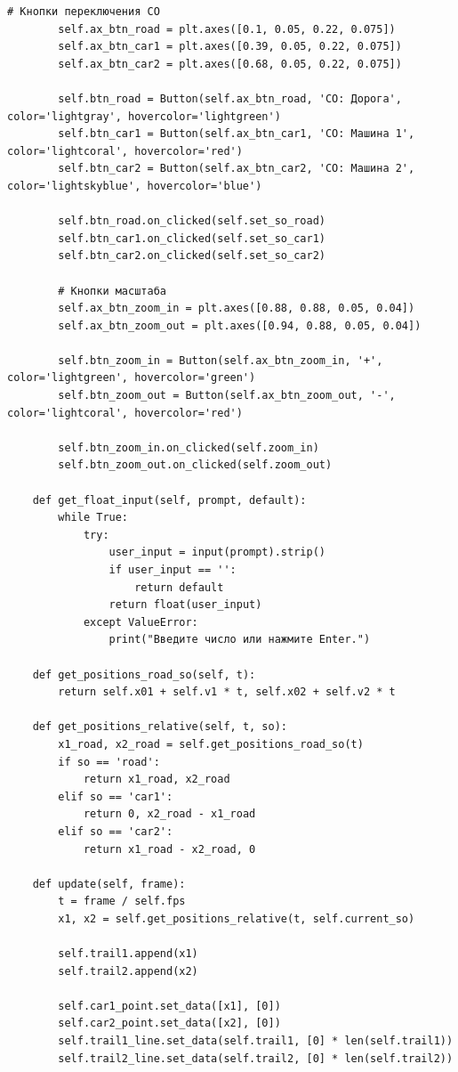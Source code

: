 \documentclass[12pt,a4paper]{article}
\begin{document}
\begin{lstlisting}[caption={Основной код симуляции (main.py)}, label={lst:main}]
        # Кнопки переключения СО
        self.ax_btn_road = plt.axes([0.1, 0.05, 0.22, 0.075])
        self.ax_btn_car1 = plt.axes([0.39, 0.05, 0.22, 0.075])
        self.ax_btn_car2 = plt.axes([0.68, 0.05, 0.22, 0.075])

        self.btn_road = Button(self.ax_btn_road, 'СО: Дорога', color='lightgray', hovercolor='lightgreen')
        self.btn_car1 = Button(self.ax_btn_car1, 'СО: Машина 1', color='lightcoral', hovercolor='red')
        self.btn_car2 = Button(self.ax_btn_car2, 'СО: Машина 2', color='lightskyblue', hovercolor='blue')

        self.btn_road.on_clicked(self.set_so_road)
        self.btn_car1.on_clicked(self.set_so_car1)
        self.btn_car2.on_clicked(self.set_so_car2)

        # Кнопки масштаба
        self.ax_btn_zoom_in = plt.axes([0.88, 0.88, 0.05, 0.04])
        self.ax_btn_zoom_out = plt.axes([0.94, 0.88, 0.05, 0.04])

        self.btn_zoom_in = Button(self.ax_btn_zoom_in, '+', color='lightgreen', hovercolor='green')
        self.btn_zoom_out = Button(self.ax_btn_zoom_out, '-', color='lightcoral', hovercolor='red')

        self.btn_zoom_in.on_clicked(self.zoom_in)
        self.btn_zoom_out.on_clicked(self.zoom_out)

    def get_float_input(self, prompt, default):
        while True:
            try:
                user_input = input(prompt).strip()
                if user_input == '':
                    return default
                return float(user_input)
            except ValueError:
                print("Введите число или нажмите Enter.")

    def get_positions_road_so(self, t):
        return self.x01 + self.v1 * t, self.x02 + self.v2 * t

    def get_positions_relative(self, t, so):
        x1_road, x2_road = self.get_positions_road_so(t)
        if so == 'road':
            return x1_road, x2_road
        elif so == 'car1':
            return 0, x2_road - x1_road
        elif so == 'car2':
            return x1_road - x2_road, 0

    def update(self, frame):
        t = frame / self.fps
        x1, x2 = self.get_positions_relative(t, self.current_so)

        self.trail1.append(x1)
        self.trail2.append(x2)

        self.car1_point.set_data([x1], [0])
        self.car2_point.set_data([x2], [0])
        self.trail1_line.set_data(self.trail1, [0] * len(self.trail1))
        self.trail2_line.set_data(self.trail2, [0] * len(self.trail2))


\end{lstlisting}
\end{document}
